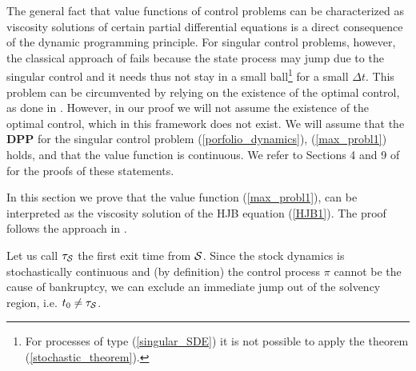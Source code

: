 The general fact that value functions of control problems can be characterized as
viscosity solutions of certain partial differential equations is a direct consequence of the dynamic
programming principle. For singular control problems, however, the classical approach of \cite{PLL83}
fails because the state process may jump due to the singular control and it needs thus not stay
in a small ball\footnote{For processes of type (\ref{singular_SDE}) it is not possible to apply the theorem (\ref{stochastic_theorem}).} 
for a small $\Delta t$.
This problem can be circumvented by relying on the
existence of the optimal control, as done in \cite{DaPaZa93}. However, in our proof we will not assume the existence of the optimal control, which  
in this framework does not exist.
We will assume that the \textbf{DPP} for the singular control problem (\ref{porfolio_dynamics}), (\ref{max_probl1}) holds, and that the value function  
is continuous. We refer to Sections 4 and 9 of \cite{Kab16} for the proofs of these statements. 

In this section we prove that the value function (\ref{max_probl1}), can be interpreted 
as the viscosity solution of the HJB equation (\ref{HJB1}).
The proof follows the approach in \cite{OkSu01}.

Let us call $\tau_{\mathcal{S}}$ the first exit time from $\mathcal{S}$.
Since the stock dynamics is stochastically continuous and (by definition) the control process $\pi$ cannot be the cause of bankruptcy,
we can exclude an immediate jump out of the solvency region, i.e. $t_0 \not = \tau_{\mathcal{S}}$.

